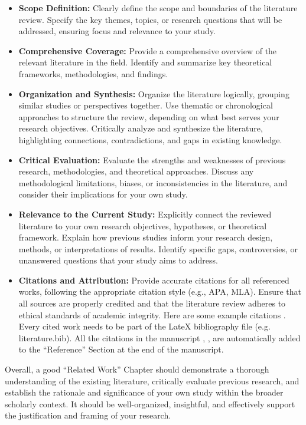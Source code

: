 \documentclass{article}
\begin{document}
\begin{itemize}
\item \textbf{Scope Definition:} Clearly define the scope and boundaries of the literature review. Specify the key themes, topics, or research questions that will be addressed, ensuring focus and relevance to your study.
\item \textbf{Comprehensive Coverage:} Provide a comprehensive overview of the relevant literature in the field. Identify and summarize key theoretical frameworks, methodologies, and findings.
\item \textbf{Organization and Synthesis:} Organize the literature logically, grouping similar studies or perspectives together. Use thematic or chronological approaches to structure the review, depending on what best serves your research objectives. Critically analyze and synthesize the literature, highlighting connections, contradictions, and gaps in existing knowledge.
\item \textbf{Critical Evaluation:} Evaluate the strengths and weaknesses of previous research, methodologies, and theoretical approaches. Discuss any methodological limitations, biases, or inconsistencies in the literature, and consider their implications for your own study.
\item \textbf{Relevance to the Current Study:} Explicitly connect the reviewed literature to your own research objectives, hypotheses, or theoretical framework. Explain how previous studies inform your research design, methods, or interpretations of results. Identify specific gaps, controversies, or unanswered questions that your study aims to address.
\item \textbf{Citations and Attribution:} Provide accurate citations for all referenced works, following the appropriate citation style (e.g., APA, MLA). Ensure that all sources are properly credited and that the literature review adheres to ethical standards of academic integrity. Here are some example citations \cite{BerglerAnimalSpot:2022,BerglerFIN:2021,BerglerLjub:2019}. Every cited work needs to be part of the LateX bibliography file (e.g. literature.bib). All the citations in the manuscript \cite{BerglerGraz:2019}, \cite{BerglerOCLEAN:2020,BerglerOSPOT:2019,BerglerPARTY:2022}, \cite{BerglerSlang:2021,BerglerWHISPER:2022} are automatically added to the ``Reference'' Section at the end of the manuscript.
\end{itemize}

Overall, a good ``Related Work'' Chapter should demonstrate a thorough understanding of the existing literature, critically evaluate previous research, and establish the rationale and significance of your own study within the broader scholarly context. It should be well-organized, insightful, and effectively support the justification and framing of your research.
\end{document}
